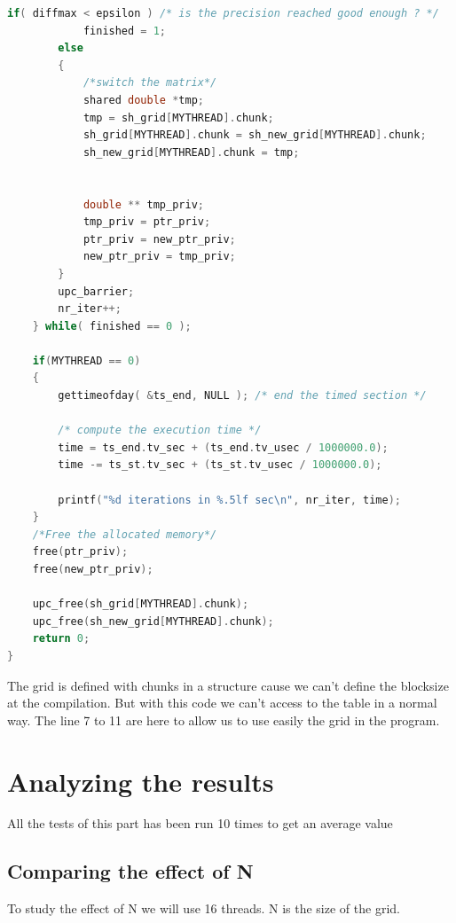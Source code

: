 \documentclass{report}
\begin{document}
\begin{lstlisting}[language=c]
        if( diffmax < epsilon ) /* is the precision reached good enough ? */
            finished = 1;
        else
        {
            /*switch the matrix*/
            shared double *tmp;
            tmp = sh_grid[MYTHREAD].chunk;
            sh_grid[MYTHREAD].chunk = sh_new_grid[MYTHREAD].chunk;
            sh_new_grid[MYTHREAD].chunk = tmp;


            double ** tmp_priv;
            tmp_priv = ptr_priv;
            ptr_priv = new_ptr_priv;
            new_ptr_priv = tmp_priv;
        }
        upc_barrier;
        nr_iter++;
    } while( finished == 0 );

    if(MYTHREAD == 0)
    {
        gettimeofday( &ts_end, NULL ); /* end the timed section */

        /* compute the execution time */
        time = ts_end.tv_sec + (ts_end.tv_usec / 1000000.0);
        time -= ts_st.tv_sec + (ts_st.tv_usec / 1000000.0);

        printf("%d iterations in %.5lf sec\n", nr_iter, time);
    }
    /*Free the allocated memory*/
    free(ptr_priv);
    free(new_ptr_priv);

    upc_free(sh_grid[MYTHREAD].chunk);
    upc_free(sh_new_grid[MYTHREAD].chunk);
    return 0;
}
\end{lstlisting}

The grid is defined with chunks in a structure cause we can't define the blocksize at the compilation. But with this code we can't access to the table in a normal way. The line 7 to 11 are here to allow us to use easily the grid in the program.

\section{Analyzing the results}

All the tests of this part has been run 10 times to get an average value

\subsection{Comparing the effect of N}

To study the effect of N we will use 16 threads. N is the size of the grid.
\end{document}
